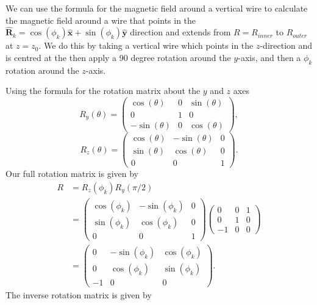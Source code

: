 \documentclass{article}
\begin{document}
We can use the formula for the magnetic field around a vertical wire to calculate the
 magnetic field around a wire that points
in the $\mathbf{\hat{R}}_k = \cos(\phi_k)\mathbf{\hat{x}}+\sin(\phi_k)\mathbf{\hat{y}}$ direction
 and extends from $R=R_{inner}$ to $R_{outer}$ at $z=z_0$.
 We do this by taking a vertical wire which points in the $z$-direction
 and is centred at the then apply a 90 degree rotation around the $y$-axis,
  and then a $\phi_k$ rotation around the $z$-axis.

Using the formula for the rotation matrix about the $y$ and $z$ axes
\[R_y(\theta) = \begin{pmatrix}
    \cos(\theta) & 0 & \sin(\theta) \\
    0 & 1 & 0 \\
    -\sin(\theta) & 0 & \cos(\theta)
\end{pmatrix},\]
\[R_z(\theta) = \begin{pmatrix}
    \cos(\theta) & -\sin(\theta) & 0 \\
    \sin(\theta) & \cos(\theta) & 0 \\
    0 & 0 & 1
\end{pmatrix}.\]
Our full rotation matrix is given by
\[\begin{aligned}
    R&=R_z(\phi_k)R_y(\pi/2) \\
    &=\begin{pmatrix}
        \cos(\phi_k) & -\sin(\phi_k) & 0 \\
        \sin(\phi_k) & \cos(\phi_k) & 0 \\
        0 & 0 & 1
    \end{pmatrix}
    \begin{pmatrix}
        0 & 0 & 1 \\
        0 & 1 & 0 \\
        -1 & 0 & 0
    \end{pmatrix} \\
    &= \begin{pmatrix}
        0 & -\sin(\phi_k) & \cos(\phi_k) \\
        0 & \cos(\phi_k) & \sin(\phi_k) \\
        -1 & 0 & 0
    \end{pmatrix}.
\end{aligned} \]
The inverse rotation matrix is given by
\end{document}
